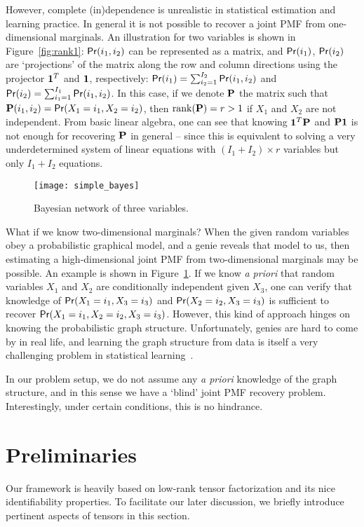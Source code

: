 \documentclass[journal]{IEEEtran}
\begin{document}
 {However, complete (in)dependence is unrealistic in statistical estimation and learning practice. In general it is not possible to recover a joint PMF from one-dimensional marginals.} An illustration for two variables is shown in Figure~\ref{fig:rank1}: ${\sf Pr}(i_1,i_2)$ can be represented as a matrix, and ${\sf Pr}(i_1)$,  ${\sf Pr}(i_2)$ are `projections' of the matrix along the row and column directions using the projector ${\bf 1}^T$ and ${\bf 1}$, respectively: {${\sf Pr}(i_1)=\sum_{i_2 = 1}^{I_2} {\sf Pr}(i_1,i_2)$ and  ${\sf Pr}(i_2)=\sum_{i_1 =1 }^{I_1} {\sf Pr}(i_1,i_2)$}.
In this case, if we denote ${\bf P}$ the matrix such that ${\bf P}(i_1,i_2)={\sf Pr}(X_1=i_1,X_2=i_2)$, then ${\rm rank}({\bf P})=r>1$ if $X_1$ and $X_2$ are not independent. From basic linear algebra, one can see that knowing ${\bf 1}^T{\bf P}$ and ${\bf P}{\bf 1}$ is not enough for recovering ${\bf P}$ in general -- since this is equivalent to solving a very underdetermined system of linear equations with $(I_1+I_2)\times r$ variables but only $I_1 + I_2$ equations. 
\begin{figure}[!t]
\centering
\texttt{[image: simple\_bayes]}
\caption{Bayesian network of three variables.}
\label{fig:simple_bayes}
\end{figure}

What if we know {two-dimensional} marginals?  When the given random variables obey a probabilistic graphical model, and a genie reveals that model to us, then estimating a {high-dimensional} joint PMF from {two-dimensional} marginals may be possible. An example is shown in Figure~\ref{fig:simple_bayes}. If we know {\it a priori} that random variables $X_1$ and $X_2$ are conditionally independent given $X_3$, one can verify that knowledge of ${\sf Pr}(X_1=i_1,X_3=i_3)$ and ${\sf Pr}(X_2=i_2,X_3=i_3)$ is sufficient to recover ${\sf Pr}(X_1=i_1,X_2=i_2,X_3=i_3)$. However, this kind of approach hinges on knowing the probabilistic graph structure. Unfortunately, genies are hard to come by in real life, and learning the graph structure from data is itself a very challenging problem in statistical learning~\cite{KoFrie2009}. 

In our problem setup, we do not assume any {\it a priori} knowledge of the graph structure, and in this sense we have a `blind' joint PMF recovery problem. Interestingly, under certain conditions, this is no hindrance.


\section{Preliminaries}
\label{sec:cpd_pmf}
Our framework is heavily based on low-rank  tensor  factorization and its nice identifiability properties.
To facilitate our later discussion, we briefly introduce pertinent aspects of tensors in this section.
\end{document}
